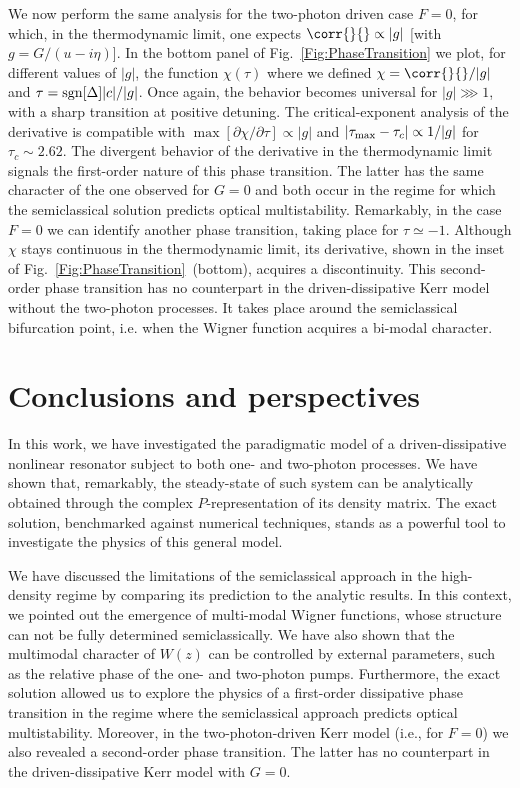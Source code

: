 We now perform the same analysis for the two-photon driven case $F=0$, for which, in the thermodynamic limit, one expects $\corr{}{}\propto|g|$ [with $g=G/(u-i\eta)$].
In the bottom panel of Fig.~\ref{Fig:PhaseTransition} we plot, for different values of $|g|$, the function $\chi(\tau)$ where we defined $\chi=\corr{}{}/|g|$ and $\tau={\rm sgn}[\Delta]|c|/|g|$.
Once again, the behavior becomes universal for $|g|\ggg1$, with a sharp transition at positive detuning.
The critical-exponent analysis of the derivative is compatible with $\max[\partial\chi/\partial\tau]\propto|g|$ and $|\tau_{\rm max}-\tau_c|\propto1/|g|$ for $\tau_c\sim2.62$.
The divergent behavior of the derivative in the thermodynamic limit signals the first-order nature of this phase transition.
The latter has the same character of the one observed for $G=0$ and both occur in the regime for which the semiclassical solution predicts optical multistability.
Remarkably, in the case $F=0$ we can identify another phase transition, taking place for $\tau\simeq-1$.
Although $\chi$ stays continuous in the thermodynamic limit, its derivative, shown in the inset of Fig.~\ref{Fig:PhaseTransition}~(bottom), acquires a discontinuity.
This second-order phase transition has no counterpart in the driven-dissipative Kerr model without the two-photon processes.
It takes place around the semiclassical bifurcation point, i.e. when the Wigner function acquires a bi-modal character.


\section{Conclusions and perspectives}\label{sec:conclusion}


In this work, we have investigated the paradigmatic model of a driven-dissipative nonlinear resonator subject to both one- and two-photon processes.
We have shown that, remarkably, the steady-state of such system can be analytically obtained through the complex $P$-representation of its density matrix.
The exact solution, benchmarked against numerical techniques, stands as a powerful tool to investigate the physics of this general model.

We have discussed the limitations of the semiclassical approach in the high-density regime by comparing its prediction to the analytic results.
In this context, we pointed out the emergence of multi-modal Wigner functions, whose structure can not be fully determined semiclassically.
We have also shown that the multimodal character of $W(z)$ can be controlled by external parameters, such as the relative phase of the one- and two-photon pumps.
Furthermore, the exact solution allowed us to explore the physics of a first-order dissipative phase transition in the regime where the semiclassical approach predicts optical multistability.
Moreover, in the two-photon-driven Kerr model (i.e., for $F=0$) we also revealed a second-order phase transition.
The latter has no counterpart in the driven-dissipative Kerr model with $G=0$.

